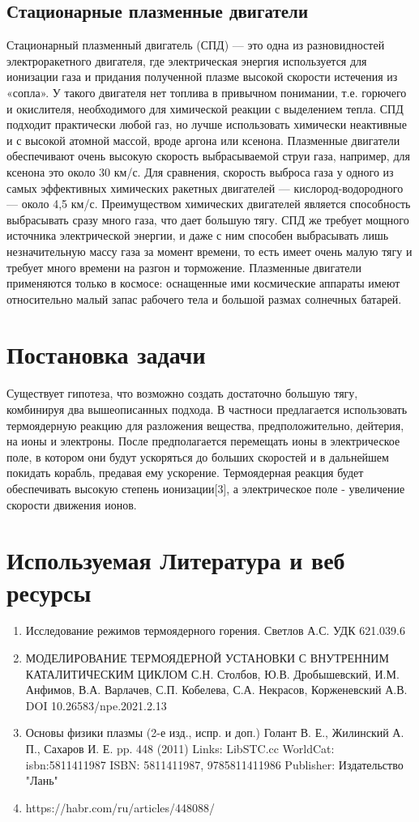 \documentclass[a4paper,11pt]{article}
\begin{document}
\subsection{Стационарные плазменные двигатели}
Стационарный плазменный двигатель (СПД) — это одна из разновидностей электроракетного двигателя, где электрическая энергия используется для ионизации газа и придания полученной плазме высокой скорости истечения из «сопла». 
У такого двигателя нет топлива в привычном понимании, т.е. горючего и окислителя, 
необходимого для химической реакции с выделением тепла. СПД подходит практически любой газ, но лучше использовать химически неактивные и с высокой атомной массой, вроде аргона или ксенона. Плазменные двигатели обеспечивают очень высокую скорость выбрасываемой струи газа, например, для ксенона это около 30 км/с. Для сравнения, скорость выброса газа у одного из самых эффективных химических ракетных двигателей — кислород-водородного — около 4,5 км/с. Преимуществом химических двигателей является способность выбрасывать сразу много газа, что дает большую тягу. СПД же требует мощного источника электрической энергии, и даже с ним способен выбрасывать лишь незначительную массу газа за момент времени, то есть имеет очень малую тягу и требует много времени на разгон и торможение. Плазменные двигатели применяются только в космосе: оснащенные ими космические аппараты имеют относительно малый запас рабочего тела и большой размах солнечных батарей.
\section{\Large Постановка задачи}
Существует гипотеза, что возможно создать достаточно большую тягу, комбинируя два вышеописанных подхода. 
В частноси предлагается использовать термоядерную реакцию для разложения вещества, предположительно, дейтерия, на ионы и электроны. 
После предполагается перемещать ионы в электрическое поле, в котором они будут ускоряться до больших скоростей и в дальнейшем покидать корабль, предавая ему ускорение.
Термоядерная реакция будет обеспечивать высокую степень ионизации[3], а электрическое поле - увеличение скорости движения ионов. 

\newpage
\section{Используемая Литература и веб ресурсы}
\begin{enumerate}
	\item Исследование режимов термоядерного горения. Светлов А.С. УДК 621.039.6
	\item МОДЕЛИРОВАНИЕ ТЕРМОЯДЕРНОЙ УСТАНОВКИ С ВНУТРЕННИМ КАТАЛИТИЧЕСКИМ ЦИКЛОМ С.Н. Столбов, Ю.В. Дробышевский, И.М. Анфимов, В.А. Варлачев, С.П. Кобелева, С.А. Некрасов, Корженевский А.В. DOI 10.26583/npe.2021.2.13
	\item Основы физики плазмы (2-е изд., испр. и доп.) Голант В. Е., Жилинский А. П., Сахаров И. Е. pp. 448 (2011) Links: LibSTC.cc WorldCat: isbn:5811411987 	ISBN: 5811411987, 9785811411986  Publisher: Издательство "Лань" 
	\item https://habr.com/ru/articles/448088/
\end{enumerate}
\end{document}
